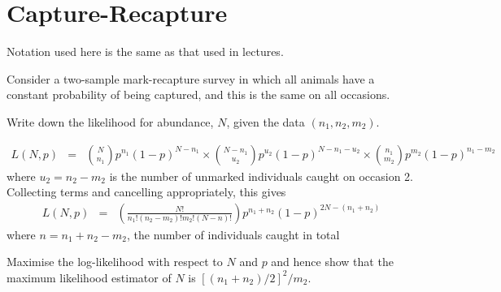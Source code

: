 \chapter{Capture-Recapture\label{ch:cr_ex}}


Notation used here is the same as that used in lectures.

\begin{questions}

\item Consider a two-sample mark-recapture survey in which all animals have a constant probability of being captured, and this is the same on all occasions.

\begin{parts}

\item Write down the likelihood for abundance, $N$, given the data $(n_1, n_2, m_2)$.

{\begin{solution}
\begin{eqnarray*}
L(N,p)&=&{N\choose n_1}p^{n_1}(1-p)^{N-n_1}\times
{N-n_1\choose u_2}p^{u_2}(1-p)^{N-n_1-u_2}\times
{n_1\choose m_2}p^{m_2}(1-p)^{n_1-m_2}
\end{eqnarray*}
\noindent
where $u_2=n_2-m_2$ is the number of unmarked individuals caught on occasion 2. Collecting terms and cancelling appropriately, this gives
\begin{eqnarray*}
L(N,p)&=&
\left(
\frac{N!}{n_1!(n_2-m_2)!m_2!(N-n)!}\right)p^{n_1+n_2}(1-p)^{2N-(n_1+n_2)}
\end{eqnarray*}
\noindent
where $n=n_1+n_2-m_2$, the number of individuals caught in total
\end{solution}}

\item Maximise the log-likelihood with respect to $N$ and $p$ and hence show that the maximum likelihood estimator of $N$ is $[(n_1+n_2)/2]^2/m_2$.


\end{parts}
\end{questions}
